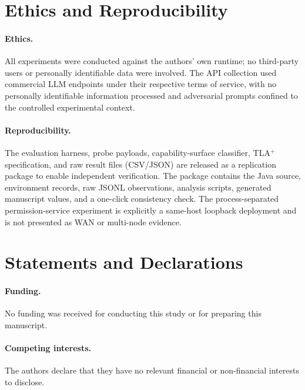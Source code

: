 \section{Ethics and Reproducibility}
\label{sec:ethics}

\paragraph{Ethics.}
All experiments were conducted against the authors' own runtime; no
third-party users or personally identifiable data were involved. The
API collection used commercial LLM endpoints under
their respective terms of service, with no personally identifiable
information processed and adversarial prompts confined to the
controlled experimental context.

\paragraph{Reproducibility.}
The evaluation harness, probe payloads, capability-surface classifier,
TLA$^+$ specification, and raw result files (CSV/JSON) are released as
a replication package to enable independent verification. The package
contains the Java source, environment records, raw JSONL observations,
analysis scripts, generated manuscript values, and a one-click consistency
check. The process-separated permission-service experiment is explicitly a
same-host loopback deployment and is not presented as WAN or multi-node
evidence.

\section*{Statements and Declarations}

\paragraph{Funding.}
No funding was received for conducting this study or for preparing this
manuscript.

\paragraph{Competing interests.}
The authors declare that they have no relevant financial or non-financial
interests to disclose.

